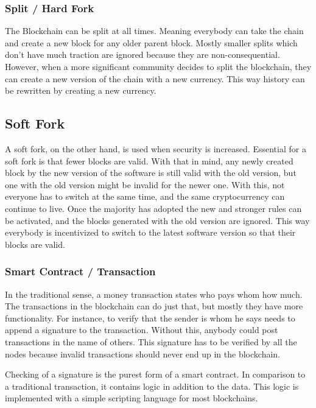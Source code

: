 \documentclass[a4paper, 11pt]{scrartcl}
\begin{document}
\subsubsection{Split / Hard Fork}

The Blockchain can be split at all times.
Meaning everybody can take the chain and create a new block for any older parent block.
Mostly smaller splits which don't have much traction are ignored because they are non-consequential. However, when a more significant community decides to split the blockchain, they can create a new version of the chain with a new currency. This way history can be rewritten by creating a new currency. 

\subsection{Soft Fork}

A soft fork, on the other hand, is used when security is increased. Essential for a soft fork is that fewer blocks are valid. With that in mind, any newly created block by the new version of the software is still valid with the old version, but one with the old version might be invalid for the newer one. With this, not everyone has to switch at the same time, and the same cryptocurrency can continue to live. Once the majority has adopted the new and stronger rules can be activated, and the blocks generated with the old version are ignored. This way everybody is incentivized to switch to the latest software version so that their blocks are valid. \cite{blockchainKai}

\subsubsection{Smart Contract / Transaction}

In the traditional sense, a money transaction states who pays whom how much.
The transactions in the blockchain can do just that, but mostly they have more functionality.
For instance, to verify that the sender is whom he says needs to append a signature to the transaction.
Without this, anybody could post transactions in the name of others.
This signature has to be verified by all the nodes because invalid transactions should never end up in the blockchain. \cite{blockchainKai}

Checking of a signature is the purest form of a smart contract.
In comparison to a traditional transaction, it contains logic in addition to the data.
This logic is implemented with a simple scripting language for most blockchains. \cite{blockchainKai}
\end{document}

